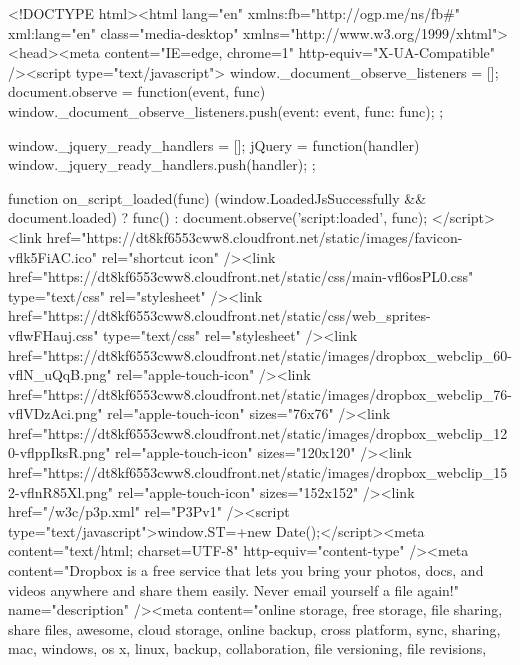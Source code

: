 <!DOCTYPE html><html lang="en" xmlns:fb="http://ogp.me/ns/fb#" xml:lang="en" class="media-desktop" xmlns="http://www.w3.org/1999/xhtml"><head><meta content="IE=edge, chrome=1" http-equiv="X-UA-Compatible" /><script type="text/javascript">
                window._document_observe_listeners = [];
                document.observe = function(event, func) {
                    window._document_observe_listeners.push({event: event, func: func});
                };

                window._jquery_ready_handlers = [];
                jQuery = function(handler) {
                    window._jquery_ready_handlers.push(handler);
                };

                function on_script_loaded(func) {
                    (window.LoadedJsSuccessfully && document.loaded) ? func() : document.observe('script:loaded', func);
                }
                </script> <link href="https://dt8kf6553cww8.cloudfront.net/static/images/favicon-vflk5FiAC.ico" rel="shortcut icon" /><link href="https://dt8kf6553cww8.cloudfront.net/static/css/main-vfl6osPL0.css" type="text/css" rel="stylesheet" /><link href="https://dt8kf6553cww8.cloudfront.net/static/css/web_sprites-vflwFHauj.css" type="text/css" rel="stylesheet" /><link href="https://dt8kf6553cww8.cloudfront.net/static/images/dropbox_webclip_60-vflN_uQqB.png" rel="apple-touch-icon" /><link href="https://dt8kf6553cww8.cloudfront.net/static/images/dropbox_webclip_76-vflVDzAci.png" rel="apple-touch-icon" sizes="76x76" /><link href="https://dt8kf6553cww8.cloudfront.net/static/images/dropbox_webclip_120-vflppIksR.png" rel="apple-touch-icon" sizes="120x120" /><link href="https://dt8kf6553cww8.cloudfront.net/static/images/dropbox_webclip_152-vflnR85Xl.png" rel="apple-touch-icon" sizes="152x152" /><link href="/w3c/p3p.xml" rel="P3Pv1" /><script type="text/javascript">window.ST=+new Date();</script><meta content="text/html; charset=UTF-8" http-equiv="content-type" /><meta content="Dropbox is a free service that lets you bring your photos, docs, and videos anywhere and share them easily. Never email yourself a file again!" name="description" /><meta content="online storage, free storage, file sharing, share files,
    awesome, cloud storage, online backup, cross platform, sync, sharing, mac,
    windows, os x, linux, backup, collaboration, file versioning, file revisions,

